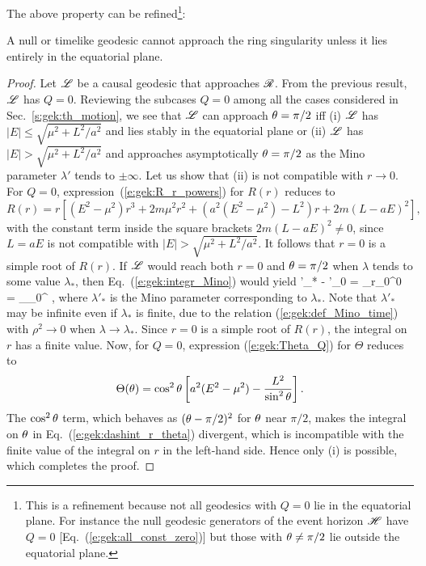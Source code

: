 The above property can be refined\footnote{This is a refinement because not all
geodesics with $Q=0$ lie in the equatorial plane. For instance the
null geodesic generators of the event horizon $\mathscr{H}$ have $Q=0$ [Eq.~(\ref{e:gek:all_const_zero})]
but those with $\theta\neq \pi/2$ lie outside the equatorial plane.}:
\begin{prop}
\label{p:gek:ring_reach_from_equat}
A null or timelike geodesic cannot approach the ring singularity unless it lies
entirely in the equatorial plane.
\end{prop}
\begin{proof}
Let $\mathscr{L}$ be a causal geodesic that approaches $\mathscr{R}$. From the previous result,
$\mathscr{L}$ has $Q=0$. Reviewing the subcases $Q=0$ among all the cases considered in
Sec.~\ref{s:gek:th_motion}, we see that $\mathscr{L}$ can approach $\theta=\pi/2$ iff
(i) $\mathscr{L}$ has
$|E|\leq \sqrt{\mu^2 + L^2/a^2}$ and lies stably in the equatorial plane
or (ii) $\mathscr{L}$ has $|E| > \sqrt{\mu^2 + L^2/a^2}$ and approaches asymptotically
$\theta=\pi/2$ as the Mino parameter $\lambda'$ tends to $\pm\infty$.
Let us show that (ii) is not compatible with $r\to 0$.
For $Q=0$, expression~(\ref{e:gek:R_r_powers}) for $R(r)$ reduces to
\[
 R(r) = r \left[ (E^2 - \mu^2) r^3 + 2 m \mu^2 r^2
     + \left( a^2(E^2 - \mu^2) - L^2 \right) r
     + 2m (L - a E)^2 \right] ,
\]
with the constant term inside the square brackets $2m(L - a E)^2 \neq 0$,
since $L=a E$ is not compatible with $|E| > \sqrt{\mu^2 + L^2/a^2}$. It
follows that $r=0$ is a simple root of $R(r)$. If $\mathscr{L}$ would reach both
$r=0$ and $\theta=\pi/2$ when $\lambda$ tends to some value $\lambda_*$,
then Eq.~(\ref{e:gek:integr_Mino}) would yield
\be \label{e:gek:dashint_r_theta}
    \lambda'_* - \lambda'_0 = \dashint_{r_0}^0 
    = \dashint_{\th_0}^{} \frac{\eps_\th \, \D \th}{\sqrt{\Theta(\th)}} ,
\ee
where $\lambda'_*$ is the Mino parameter corresponding to $\lambda_*$. Note that
$\lambda'_*$ may be infinite even if $\lambda_*$ is finite, due to the
relation (\ref{e:gek:def_Mino_time}) with $\rho^2\to 0$ when $\lambda\to\lambda_*$.
Since $r=0$ is a simple root of $R(r)$, the integral on $r$ has a finite value.
Now, for $Q=0$, expression (\ref{e:gek:Theta_Q}) for $\Theta$ reduces to
\[
    \Theta(\theta) = \cos^2\theta \left[ a^2 (E^2 - \mu^2)
    - \frac{L^2}{\sin^2\theta} \right] .
\]
The $\cos^2\theta$ term, which behaves as $(\theta - \pi/2)^2$ for $\theta$ near $\pi/2$,
makes the integral on $\theta$ in
Eq.~(\ref{e:gek:dashint_r_theta}) divergent, which is incompatible with the
finite value of the integral on $r$ in the left-hand side. Hence only (i) is possible, which completes
the proof.
\end{proof}

